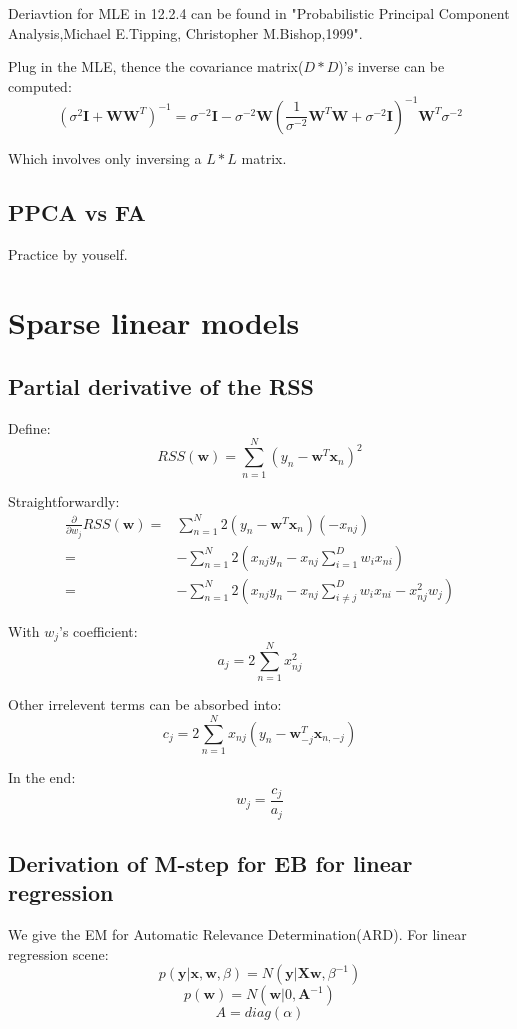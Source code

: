 \documentclass[UTF8]{ctexart}
\begin{document}
Deriavtion for MLE in 12.2.4 can be found in "Probabilistic Principal Component Analysis,Michael E.Tipping, Christopher M.Bishop,1999".

Plug in the MLE, thence the covariance matrix($D*D$)'s inverse can be computed:
$$(\sigma^{2}\textbf{I}+\textbf{W}\textbf{W}^{T})^{-1}=\sigma^{-2}\textbf{I} - \sigma^{-2}\textbf{W}(\frac{1}{\sigma^{-2}}\textbf{W}^{T}\textbf{W}+\sigma^{-2}\textbf{I})^{-1}\textbf{W}^{T}\sigma^{-2}$$

Which involves only inversing a $L*L$ matrix.

\subsection{PPCA vs FA}
Practice by youself.


\newpage
\section{Sparse linear models}
\subsection{Partial derivative of the RSS}
Define:
$$RSS(\textbf{w})=\sum_{n=1}^{N}(y_{n}-\textbf{w}^{T}\textbf{x}_{n})^{2}$$

Straightforwardly:
\begin{align}
\frac{\partial}{\partial w_{j}}RSS(\textbf{w})=&\sum_{n=1}^{N}2(y_{n}-\textbf{w}^{T}\textbf{x}_{n})(-x_{nj})\nonumber \\
=&-\sum_{n=1}^{N}2(x_{nj}y_{n}-x_{nj}\sum_{i=1}^{D}w_{i}x_{ni})\nonumber \\
=&-\sum_{n=1}^{N}2(x_{nj}y_{n}-x_{nj}\sum_{i\neq j}^{D}w_{i}x_{ni}-x_{nj}^{2}w_{j})\nonumber
\end{align}

With $w_{j}$'s coefficient:
$$a_{j}=2\sum_{n=1}^{N}x_{nj}^{2}$$

Other irrelevent terms can be absorbed into:
$$c_{j}=2\sum_{n=1}^{N}x_{nj}(y_{n}-\textbf{w}_{-j}^{T}\textbf{x}_{n,-j})$$

In the end:
$$w_{j}=\frac{c_{j}}{a_{j}}$$

\subsection{Derivation of M-step for EB for linear regression}
We give the EM for Automatic Relevance Determination(ARD). For linear regression scene:
$$p(\textbf{y}|\textbf{x},\textbf{w},\beta)=N(\textbf{y}|\textbf{X}\textbf{w},\beta^{-1})$$
$$p(\textbf{w})=N(\textbf{w}|0,\textbf{A}^{-1})$$
$$A=diag(\alpha)$$
\end{document}
